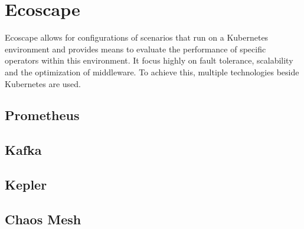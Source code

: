 \section{Ecoscape}
Ecoscape allows for configurations of scenarios that run on a Kubernetes environment and provides means to evaluate the performance of specific operators within this environment.
It focus highly on fault tolerance, scalability and the optimization of middleware.
To achieve this, multiple technologies beside Kubernetes are used.
\subsection{Prometheus}
\subsection{Kafka}
\subsection{Kepler}
\subsection{Chaos Mesh}
